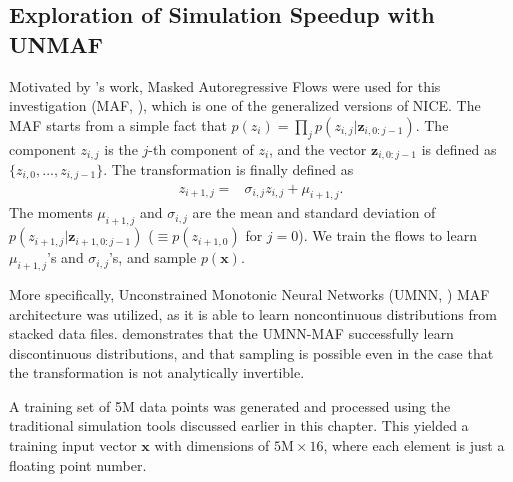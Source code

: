 \subsection{Exploration of Simulation Speedup with UNMAF}

    Motivated by \parencite{Weisser2021ThePhysics}'s work, Masked Autoregressive Flows were used for this investigation (MAF, \cite{Papamakarios2017MaskedEstimation}), which is one of the generalized versions of NICE. The MAF starts from a simple fact that $p(z_{i}) = \prod\limits_{j}p(z_{i,j}|\mathbf{z}_{i,0:j-1})$. The component $z_{i,j}$ is the $j$-th component of $z_i$, and the vector $\mathbf{z}_{i,0:j-1}$ is defined as $\{z_{i, 0}, ..., z_{i, j-1}\}$. The transformation is finally defined as
    \begin{align}
        z_{i+1, j}=& \sigma_{i, j} z_{i, j} + \mu_{i+1, j}.
    \end{align}
    The moments $\mu_{i+1, j}$ and $\sigma_{i, j}$ are the mean and standard deviation of $p(z_{i+1,j}|\mathbf{z}_{i+1,0:j-1})$ ($\equiv p(z_{i+1,0})$ for $j=0$). We train the flows to learn $\mu_{i+1, j}$'s and $\sigma_{i, j}$'s, and sample $p(\mathbf{x})$. 

    More specifically, Unconstrained Monotonic Neural Networks (UMNN, \cite{Wehenkel2019UnconstrainedNetworks}) MAF architecture was utilized, as it is able to learn noncontinuous distributions from stacked data files. \parencite{Wehenkel2019UnconstrainedNetworks} demonstrates that the UMNN-MAF successfully learn discontinuous distributions, and that sampling is possible even in the case that the transformation is not analytically invertible.
    
    A training set of 5M data points was generated and processed using the traditional simulation tools discussed earlier in this chapter. This yielded a training input vector $\mathbf{x}$ with dimensions of $5\text{M}\times16$, where each element is just a floating point number.

